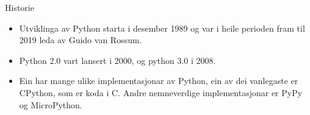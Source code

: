 \begin{frame}{Historie}
  \begin{itemize}
    \item Utviklinga av Python starta i desember 1989 og var i heile perioden fram til 2019 leda av Guido van Rossum.
    \item Python 2.0 vart lansert i 2000, og python 3.0 i 2008.
    \item Ein har mange ulike implementasjonar av Python, ein av dei vanlegaste er CPython, som er koda i C. Andre nemneverdige implementasjonar er PyPy og MicroPython.
  \end{itemize}

\end{frame}


